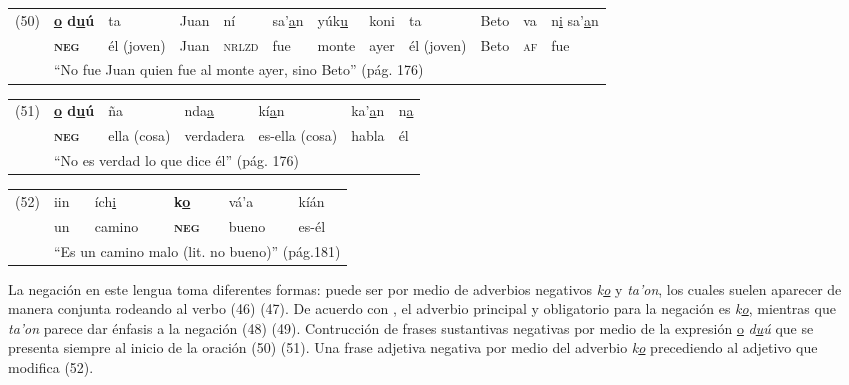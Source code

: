 {%
{\small
\begin{tabular}{llllllllllll}
 (50) & \textbf{\underline{o} d\underline{u}ú} & ta & Juan & ní & sa'\underline{a}n & yúk\underline{u} & koni & ta & Beto & va & n\underline{i} sa'\underline{a}n \\
 & \textsc{\textbf{neg}} & él (joven) & Juan & \textsc{nrlzd} & fue & monte & ayer & él (joven) & Beto & \textsc{af} & fue \\
 & \multicolumn{11}{l}{``No fue Juan quien fue al monte ayer, sino Beto'' (pág. 176)}
\end{tabular} \vspace{0.2cm}
}

\begin{tabular}{lllllll}
(51) & \textbf{\underline{o} d\underline{u}ú} & ña & nda\underline{a} & kí\underline{a}n & ka'\underline{a}n & n\underline{a} \\
& \textsc{\textbf{neg}} & ella (cosa) & verdadera & es-ella (cosa) & habla & él \\
& \multicolumn{6}{l}{``No es verdad lo que dice él'' (pág. 176)}
\end{tabular} \vspace{0.2cm}

\begin{tabular}{llllll}
(52) & iin & ích\underline{i} & \textbf{k\underline{o}} & vá'a & kíán \\
& un & camino & \textsc{\textbf{neg}} & bueno & es-él \\
& \multicolumn{5}{l}{``Es un camino malo (lit. no bueno)'' (pág.181)}
\end{tabular} \vspace{0.3cm}

}

La negación en este lengua toma diferentes formas: puede ser por medio de adverbios negativos {\setmainfont{Charis SIL} \textit{k\underline{o}} y \textit{ta'on}}, los cuales suelen aparecer de manera conjunta rodeando al verbo (46) (47). De acuerdo con \textcolor{MidnightBlue}{\citet{Mixteco}}, el adverbio principal y obligatorio para la negación es {\setmainfont{Charis SIL} \textit{k\underline{o}}}, mientras que {\setmainfont{Charis SIL} \textit{ta'on}} parece dar énfasis a la negación (48) (49). Contrucción de frases sustantivas negativas por medio de la expresión {\setmainfont{Charis SIL} \underline{o} \textit{d\underline{u}ú}} que se presenta siempre al inicio de la oración (50) (51). Una frase adjetiva negativa por medio del adverbio {\setmainfont{Charis SIL} \textit{k\underline{o}}} precediendo al adjetivo que modifica (52).
